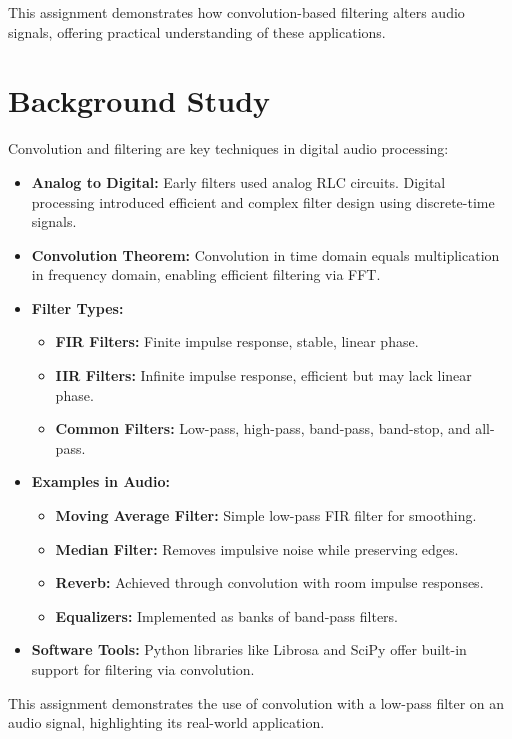 \documentclass[12pt, a4paper]{article}
\begin{document}
This assignment demonstrates how convolution-based filtering alters audio signals, offering practical understanding of these applications.
\section{Background Study}
\label{sec:background_study}

Convolution and filtering are key techniques in digital audio processing:

\begin{itemize}
    \item \textbf{Analog to Digital:} Early filters used analog RLC circuits. Digital processing introduced efficient and complex filter design using discrete-time signals.
    \item \textbf{Convolution Theorem:} Convolution in time domain equals multiplication in frequency domain, enabling efficient filtering via FFT.
    \item \textbf{Filter Types:}
    \begin{itemize}
        \item \textbf{FIR Filters:} Finite impulse response, stable, linear phase.
        \item \textbf{IIR Filters:} Infinite impulse response, efficient but may lack linear phase.
        \item \textbf{Common Filters:} Low-pass, high-pass, band-pass, band-stop, and all-pass.
    \end{itemize}
    \item \textbf{Examples in Audio:}
    \begin{itemize}
        \item \textbf{Moving Average Filter:} Simple low-pass FIR filter for smoothing.
        \item \textbf{Median Filter:} Removes impulsive noise while preserving edges.
        \item \textbf{Reverb:} Achieved through convolution with room impulse responses.
        \item \textbf{Equalizers:} Implemented as banks of band-pass filters.
    \end{itemize}
    \item \textbf{Software Tools:} Python libraries like Librosa and SciPy offer built-in support for filtering via convolution.
\end{itemize}

This assignment demonstrates the use of convolution with a low-pass filter on an audio signal, highlighting its real-world application.
\end{document}
